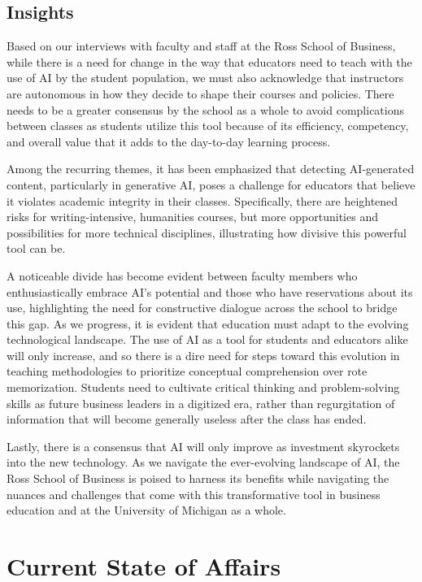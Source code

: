 \documentclass[
]{book}
\begin{document}
\hypertarget{insights}{%
\section{Insights}\label{insights}}

Based on our interviews with faculty and staff at the Ross School of Business, while there is a need for change in the way that educators need to teach with the use of AI by the student population, we must also acknowledge that instructors are autonomous in how they decide to shape their courses and policies. There needs to be a greater consensus by the school as a whole to avoid complications between classes as students utilize this tool because of its efficiency, competency, and overall value that it adds to the day-to-day learning process.

Among the recurring themes, it has been emphasized that detecting AI-generated content, particularly in generative AI, poses a challenge for educators that believe it violates academic integrity in their classes. Specifically, there are heightened risks for writing-intensive, humanities courses, but more opportunities and possibilities for more technical disciplines, illustrating how divisive this powerful tool can be.

A noticeable divide has become evident between faculty members who enthusiastically embrace AI's potential and those who have reservations about its use, highlighting the need for constructive dialogue across the school to bridge this gap. As we progress, it is evident that education must adapt to the evolving technological landscape. The use of AI as a tool for students and educators alike will only increase, and so there is a dire need for steps toward this evolution in teaching methodologies to prioritize conceptual comprehension over rote memorization. Students need to cultivate critical thinking and problem-solving skills as future business leaders in a digitized era, rather than regurgitation of information that will become generally useless after the class has ended.

Lastly, there is a consensus that AI will only improve as investment skyrockets into the new technology. As we navigate the ever-evolving landscape of AI, the Ross School of Business is poised to harness its benefits while navigating the nuances and challenges that come with this transformative tool in business education and at the University of Michigan as a whole.

\hypertarget{current-state-of-affairs}{%
\chapter{Current State of Affairs}\label{current-state-of-affairs}}
\end{document}
